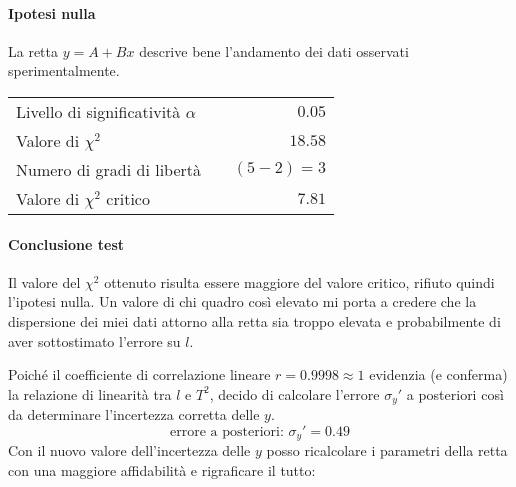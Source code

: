 \documentclass{article}
\begin{document}
	\paragraph{Ipotesi nulla} La retta $y = A + Bx$ descrive bene l'andamento dei dati osservati sperimentalmente.
	
	\vspace{0.7cm}
	\begin{table}[H]
		\centering
		\begin{tabular}{lr} 
			Livello di significatività $\alpha$		&$\quad 0.05$  \\
			Valore di $\chi ^2$             	& $\quad 18.58$       \\
			Numero di gradi di libertà      	& $\quad (5-2) = 3$         \\   
			Valore di $\chi ^2$ critico     	& $\quad 7.81$
		\end{tabular}
	\end{table}
	\vspace{0.7cm}
	
	\paragraph{Conclusione test} Il valore del $\chi^2$ ottenuto risulta essere maggiore del valore critico, rifiuto quindi l'ipotesi nulla. Un valore di chi quadro così elevato mi porta a credere che la dispersione dei miei dati attorno alla retta sia troppo elevata e probabilmente di aver sottostimato l'errore su $l$. 
	
	Poiché il coefficiente di correlazione lineare $r = 0.9998 \approx 1$ evidenzia (e conferma) la relazione di linearità tra $l$ e $T^2$, decido di calcolare l'errore $\sigma_y'$ a  posteriori così da determinare l'incertezza corretta delle $y$.
	\[
	\text{errore a posteriori: } \sigma_y' = 0.49
	\]	
	Con il nuovo valore dell'incertezza delle $y$ posso ricalcolare i parametri della retta con una maggiore affidabilità e rigraficare il tutto:
	
\end{document}
